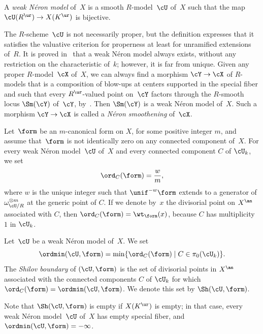 \begin{definition}
A {\em weak Néron model} of~$X$ is a smooth $R$\nobreakdash-model~$\cU$ of~$X$ such that the map $\cU(R^{\ur})\to X(K^{\ur})$ is bijective.
\end{definition}

The $R$\nobreakdash-scheme~$\cU$ is not necessarily proper, but the definition expresses that it satisfies the valuative criterion for properness at least for unramified extensions of~$R$. It is proved in~\cite{BLR} that a weak Néron model always exists, without any restriction on the characteristic of~$k$; however, it is far from unique. Given any proper $R$\nobreakdash-model~$\cX$ of~$X$, we can always find a morphism $\cY\to \cX$ of $R$\nobreakdash-models that is a composition of blow-ups at centers supported in the special fiber and such that every $R^{\ur}$-valued point on~$\cY$ factors through the $R$\nobreakdash-smooth locus $\Sm(\cY)$ of~$\cY$, by~\cite[3.4/2]{BLR}. Then $\Sm(\cY)$ is a weak Néron model of~$X$. Such a morphism $\cY\to \cX$ is called a {\em Néron smoothening} of~$\cX$.

Let~$\form$ be an $m$-canonical form on $X$, for some positive integer $m$, and assume that~$\form$ is not identically zero on any connected component of~$X$.
For every weak Néron model~$\cU$ of~$X$ and every connected component $C$ of $\cU_k$, we set
\[
\ord_C(\form)=\frac{w}{m},
\]
where $w$ is the unique integer such that $\unif^{-w} \form$ extends to a generator of $\omega^{\otimes m}_{\cU/R}$ at the generic point of $C$.
If we denote by~$x$ the divisorial point on $X^{\an}$ associated with $C$, then $\ord_C(\form)=\wt_{\form}(x)$, because $C$ has multiplicity $1$ in $\cU_k$.

\begin{definition}\label{defi:shilov}
Let~$\cU$ be a weak Néron model of~$X$. We set
\[
\ordmin(\cU,\form)=\min\{\ord_C(\form)\mid C\in \pi_0(\cU_k)\}.
\]
The {\em Shilov boundary} of $(\cU,\form)$ is the set of divisorial points in $X^{\an}$ associated with the connected components $C$ of $\cU_k$ for which $\ord_C(\form)=\ordmin(\cU,\form)$. We denote this set by $\Sh(\cU,\form)$.
\end{definition}
Note that $\Sh(\cU,\form)$ is empty if $X(K^{\ur})$ is empty; in that case, every weak Néron model~$\cU$ of~$X$ has empty special fiber, and $\ordmin(\cU,\form)=-\infty$.

